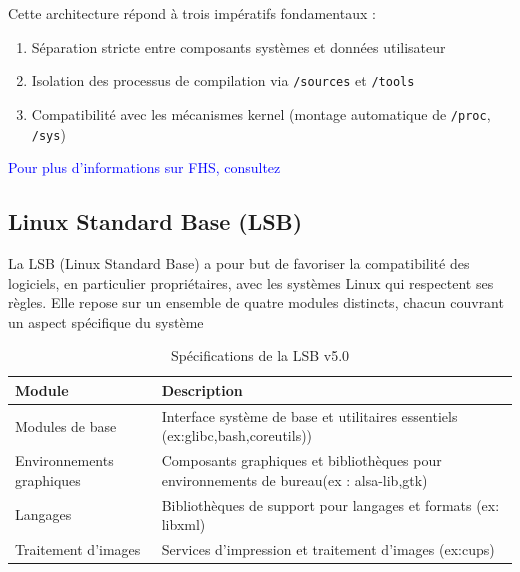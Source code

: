 Cette architecture répond à trois impératifs fondamentaux :
\begin{enumerate}
    \item Séparation stricte entre composants systèmes et données utilisateur
    \item Isolation des processus de compilation via \texttt{/sources} et \texttt{/tools}
    \item Compatibilité avec les mécanismes kernel (montage automatique de \texttt{/proc}, \texttt{/sys})
\end{enumerate}


\textcolor{blue}{Pour plus d’informations sur FHS, consultez \cite{FHS}}

\subsection{Linux Standard Base (LSB) }
\label{sssec:lsb}
La LSB (Linux Standard Base) a pour but de favoriser la compatibilité des logiciels, en particulier propriétaires, avec les systèmes Linux qui respectent ses règles. Elle repose sur un ensemble de quatre modules distincts, chacun couvrant un aspect spécifique du système

\begin{table}[htbp]
  \centering
  \caption{Spécifications de la LSB v5.0}
  \label{tab:lsb-specs}
  \begin{tabular}{|l| p{8cm}|}
    \toprule
    \textbf{Module} & \textbf{Description} \\
    \midrule
   Modules de base    & Interface système de base et utilitaires essentiels (ex:glibc,bash,coreutils)) \\ \hline
    Environnements graphiques  & Composants graphiques et bibliothèques pour environnements de bureau(ex : alsa-lib,gtk)  \\ \hline
    Langages & Bibliothèques de support pour langages et formats (ex: libxml) \\  \hline
    Traitement d'images & Services d’impression et traitement d’images (ex:cups)  \\
    \bottomrule
  \end{tabular}
\end{table}




